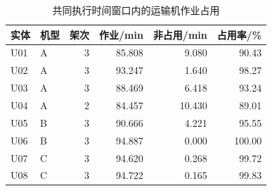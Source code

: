 \begin{table}[htbp]\centering\small
\caption{共同执行时间窗口内的运输机作业占用}\label{tab:rev_q2_util}
\begin{tabular}{llrrrr}\toprule
实体 & 机型 & 架次 & 作业/min & 非占用/min & 占用率/\%\\\midrule
U01 & A & 3 & 85.808 & 9.080 & 90.43\\
U02 & A & 3 & 93.247 & 1.640 & 98.27\\
U03 & A & 3 & 88.469 & 6.418 & 93.24\\
U04 & A & 2 & 84.457 & 10.430 & 89.01\\
U05 & B & 3 & 90.666 & 4.221 & 95.55\\
U06 & B & 3 & 94.887 & 0.000 & 100.00\\
U07 & C & 3 & 94.620 & 0.268 & 99.72\\
U08 & C & 3 & 94.722 & 0.165 & 99.83\\
\bottomrule\end{tabular}
\end{table}
